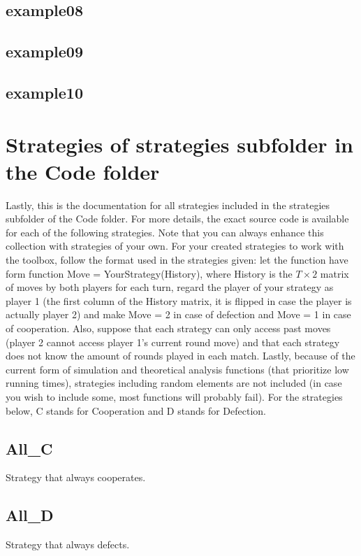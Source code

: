 \documentclass[12pt]{article}
\begin{document}
\subsection{example08}

\subsection{example09}

\subsection{example10}

\section{Strategies of strategies subfolder in the Code folder}
Lastly, this is the documentation for all strategies included in the strategies subfolder of the Code folder. For more details, the exact source code is available for each of the following strategies. Note that you can always enhance this collection with strategies of your own. For your created strategies to work with the toolbox, follow the format used in the strategies given: let the function have form function Move = YourStrategy(History), where History is the $T \times 2$ matrix of moves by both players for each turn, regard the player of your strategy as player 1 (the first column of the History matrix, it is flipped in case the player is actually player 2) and make Move = 2 in case of defection and Move = 1 in case of cooperation. Also, suppose that each strategy can only access past moves (player 2 cannot access player 1's current round move) and that each strategy does not know the amount of rounds played in each match. Lastly, because of the current form of simulation and theoretical analysis functions (that prioritize low running times), strategies including random elements are not included (in case you wish to include some, most functions will probably fail). For the strategies below, C stands for Cooperation and D stands for Defection.

\subsection{All\_C}
Strategy that always cooperates.

\subsection{All\_D}
Strategy that always defects.
\end{document}
